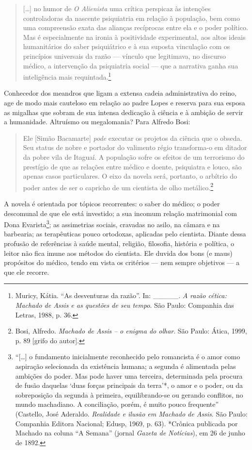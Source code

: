 \begin{quote}
{[}\ldots{}{]} no humor de \emph{O Alienista} uma crítica perspicaz às
intenções controladoras da nascente psiquiatria em relação à população,
bem como uma compreensão exata das alianças recíprocas entre ela e o
poder político. Mas é especialmente na ironia à positividade
experimental, aos altos ideais humanitários do saber psiquiátrico e à
sua suposta vinculação com os princípios universais da razão --- vínculo
que legitimava, no discurso médico, a intervenção da psiquiatria social
--- que a narrativa ganha sua inteligência mais requintada.\footnote{Muricy,
  Kátia. ``As desventuras da razão''. In: \_\_\_\_\_. \emph{A razão
  cética: Machado de Assis e as questões de seu tempo}. São Paulo:
  Companhia das Letras, 1988, p. 36.}
\end{quote}

Conhecedor dos meandros que ligam a extensa cadeia administrativa do
reino, age de modo mais cauteloso em relação ao padre Lopes e reserva
para sua esposa as migalhas que sobram de sua intensa dedicação à
ciência e à ambição de servir a humanidade. Altruísmo ou megalomania?
Para Alfredo Bosi:

\begin{quote}
Ele {[}Simão Bacamarte{]} \emph{pode} executar os projetos da ciência
que o obseda. Seu status de nobre e portador do valimento régio
transforma-o em ditador da pobre vila de Itaguaí. A população sofre os
efeitos de um terrorismo do prestígio de que as relações entre médico e
doente, psiquiatra e louco, são apenas casos particulares. O eixo da
novela será, portanto, o arbítrio do poder antes de ser o capricho de um
cientista de olho metálico.\footnote{Bosi, Alfredo. \emph{Machado de
  Assis -- o enigma do olhar}. São Paulo: Ática, 1999, p. 89 {[}grifo do
  autor{]}.}
\end{quote}

A novela é orientada por tópicos recorrentes: o saber do médico; o poder
descomunal de que ele está investido; a sua incomum relação matrimonial
com Dona Evarista\footnote{``{[}\ldots{}{]} o fundamento inicialmente
  reconhecido pelo romancista é o amor como aspiração selecionada da
  existência humana; a segunda é alimentada pelas ambições do poder. Mas
  pode haver uma terceira, determinada pela procura de fusão daquelas
  `duas forças principais da terra'*, o amor e o poder, ou da
  sobreposição da segunda à primeira, equilibrando-se ou gerando
  conflitos, no mundo machadiano. A conciliação, porém, é muito pouco
  frequente'' (Castello, José Aderaldo. \emph{Realidade e ilusão em
  Machado de Assis}. São Paulo: Companhia Editora Nacional; Edusp, 1969,
  p. 63). *Crônica publicada por Machado na coluna ``A Semana'' (jornal
  \emph{Gazeta de Notícias}), em 26 de junho de 1892.}; as assimetrias
sociais, cravadas no asilo, na câmara e na barbearia; as terapêuticas
pouco ortodoxas, aplicadas pelo cientista. Diante dessa profusão de
referências à saúde mental, religião, filosofia, história e política, o
leitor não fica imune aos métodos do cientista. Ele duvida dos bons (e
maus) propósitos do médico, tendo em vista os critérios --- nem sempre
objetivos --- a que ele recorre.


